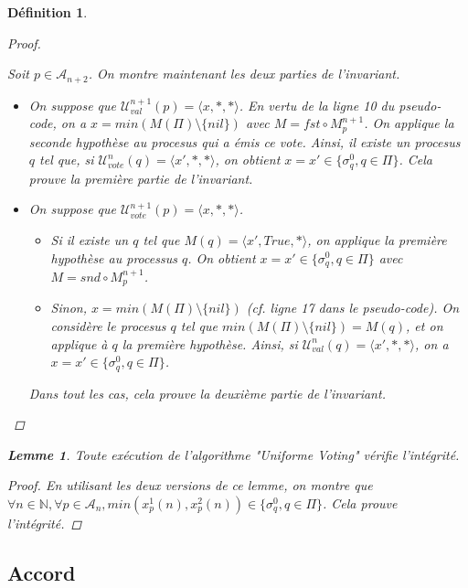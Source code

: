 \documentclass{article}
\newtheorem{lemma}{Lemme}
\newtheorem{definition}{Définition}
\begin{document}
\begin{definition}
\begin{proof}
\begin{itemize}
	\end{itemize}
	Soit $p \in \mathcal{A}_{n+2}$. On montre maintenant les deux parties de l'invariant.
	\begin{itemize}

		\item On suppose que $\mathcal{U}^{n+1}_{val}(p) = \langle x, *, * \rangle$.
			En vertu de la ligne 10 du pseudo-code, on a $x = min (M(\Pi) \setminus \{nil\})$ avec $M = fst \circ M^{n+1}_p$.
			On applique la seconde hypothèse au procesus qui a émis ce vote.
			Ainsi, il existe un procesus $q$ tel que, si $\mathcal{U}_{vote}^n(q) = \langle x', *, *\rangle$, on obtient $x = x' \in \{\sigma^0_q, q \in \Pi\}$.
			Cela prouve la première partie de l'invariant.
		\item On suppose que $\mathcal{U}^{n+1}_{vote}(p) = \langle x, *, * \rangle$.
			\begin{itemize}
				\item Si il existe un $q$ tel que $M(q) = \langle x', True, * \rangle$, on applique la première hypothèse au processus $q$.
					On obtient $x = x' \in \{\sigma^0_q, q \in \Pi\}$ avec $M = snd \circ M^{n+1}_p$.
				\item Sinon, $x = min (M(\Pi) \setminus \{nil\})$ (cf. ligne 17 dans le pseudo-code).
					On considère le procesus $q$ tel que $min (M(\Pi) \setminus \{nil\}) = M(q)$,
					et on applique à $q$ la première hypothèse. Ainsi, si $\mathcal{U}_{val}^n(q) = \langle x', *, * \rangle$, on a $x = x' \in \{\sigma^0_q, q \in \Pi\}$.
			\end{itemize}
			Dans tout les cas, cela prouve la deuxième partie de l'invariant.
	\end{itemize}
\end{proof}

\begin{lemma}
	Toute exécution de l'algorithme "Uniforme Voting" vérifie l'intégrité.
\end{lemma}
\begin{proof}
	En utilisant les deux versions de ce lemme, on montre que $\forall n \in \mathds{N}, \forall p \in \mathcal{A}_n, min (x^1_p(n), x^2_p(n)) \in \{\sigma^0_q, q \in \Pi\}$.
	Cela prouve l'intégrité.
\end{proof}

\subsection{Accord}


\end{definition}
\end{document}
